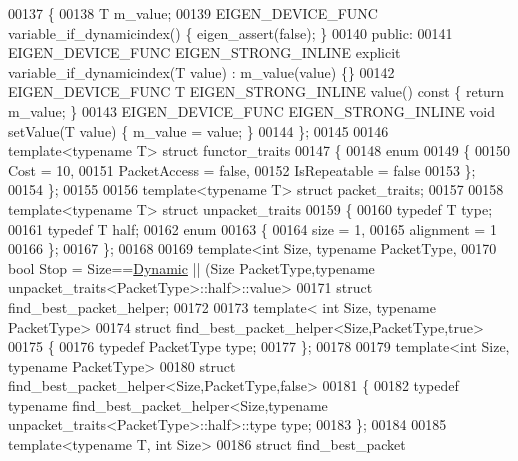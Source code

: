 \begin{DoxyCode}
00137 \{
00138     T m\_value;
00139     EIGEN\_DEVICE\_FUNC variable\_if\_dynamicindex() \{ eigen\_assert(\textcolor{keyword}{false}); \}
00140   \textcolor{keyword}{public}:
00141     EIGEN\_DEVICE\_FUNC EIGEN\_STRONG\_INLINE \textcolor{keyword}{explicit} variable\_if\_dynamicindex(T value) : m\_value(value) \{\}
00142     EIGEN\_DEVICE\_FUNC T EIGEN\_STRONG\_INLINE value()\textcolor{keyword}{ const }\{ \textcolor{keywordflow}{return} m\_value; \}
00143     EIGEN\_DEVICE\_FUNC EIGEN\_STRONG\_INLINE \textcolor{keywordtype}{void} setValue(T value) \{ m\_value = value; \}
00144 \};
00145 
00146 \textcolor{keyword}{template}<\textcolor{keyword}{typename} T> \textcolor{keyword}{struct }functor\_traits
00147 \{
00148   \textcolor{keyword}{enum}
00149   \{
00150     Cost = 10,
00151     PacketAccess = \textcolor{keyword}{false},
00152     IsRepeatable = \textcolor{keyword}{false}
00153   \};
00154 \};
00155 
00156 \textcolor{keyword}{template}<\textcolor{keyword}{typename} T> \textcolor{keyword}{struct }packet\_traits;
00157 
00158 \textcolor{keyword}{template}<\textcolor{keyword}{typename} T> \textcolor{keyword}{struct }unpacket\_traits
00159 \{
00160   \textcolor{keyword}{typedef} T type;
00161   \textcolor{keyword}{typedef} T half;
00162   \textcolor{keyword}{enum}
00163   \{
00164     size = 1,
00165     alignment = 1
00166   \};
00167 \};
00168 
00169 \textcolor{keyword}{template}<\textcolor{keywordtype}{int} Size, \textcolor{keyword}{typename} PacketType,
00170          \textcolor{keywordtype}{bool} Stop = Size==\hyperlink{namespace_eigen_ad81fa7195215a0ce30017dfac309f0b2}{Dynamic} || (Size%
      PacketType,\textcolor{keyword}{typename} unpacket\_traits<PacketType>::half>::value>
00171 \textcolor{keyword}{struct} find\_best\_packet\_helper;
00172 
00173 \textcolor{keyword}{template}< \textcolor{keywordtype}{int} Size, \textcolor{keyword}{typename} PacketType>
00174 \textcolor{keyword}{struct }find\_best\_packet\_helper<Size,PacketType,true>
00175 \{
00176   \textcolor{keyword}{typedef} PacketType type;
00177 \};
00178 
00179 \textcolor{keyword}{template}<\textcolor{keywordtype}{int} Size, \textcolor{keyword}{typename} PacketType>
00180 \textcolor{keyword}{struct }find\_best\_packet\_helper<Size,PacketType,false>
00181 \{
00182   \textcolor{keyword}{typedef} \textcolor{keyword}{typename} find\_best\_packet\_helper<Size,typename unpacket\_traits<PacketType>::half>::type type;
00183 \};
00184 
00185 \textcolor{keyword}{template}<\textcolor{keyword}{typename} T, \textcolor{keywordtype}{int} Size>
00186 \textcolor{keyword}{struct }find\_best\_packet

\end{DoxyCode}
